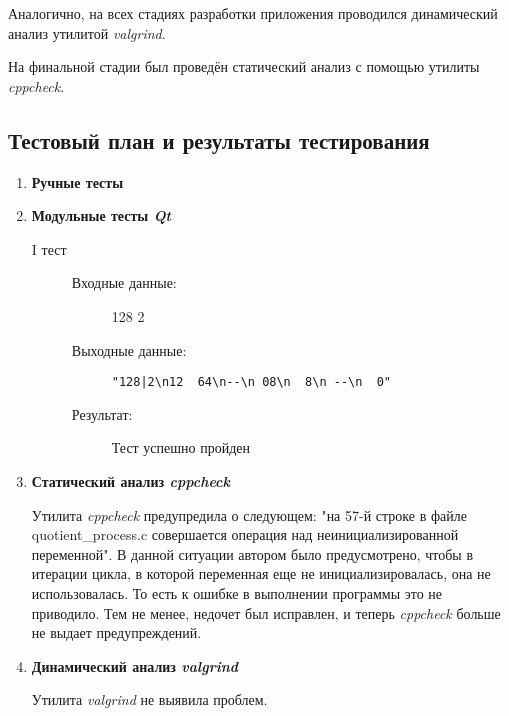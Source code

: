 \documentclass[12pt,a4paper]{report}
\begin{document}
Аналогично, на всех стадиях разработки приложения проводился динамический анализ утилитой \textit{valgrind}.

На финальной стадии был проведён статический анализ с помощью утилиты \textit{cppcheck}.
\subsection{Тестовый план и результаты тестирования}
\hspace{\parindent}
\begin{enumerate}

\item \textbf{Ручные тесты}


\item \textbf{Модульные тесты \textit{Qt}}

\begin{description}
\item[I тест]
\hspace{\parindent}
\begin{flushleft}
\begin{description}
\item[Входные данные:] 128 2
\item[Выходные данные:] \verb/"128|2\n12  64\n--\n 08\n  8\n --\n  0"/
\item[Результат:] Тест успешно пройден
\end{description}
\end{flushleft}
\end{description}

\item \textbf{Статический анализ \textit{cppcheck}}

Утилита \textit{cppcheck} предупредила о следующем: "на 57-й строке в файле quotient\_process.c совершается операция над неинициализированной переменной".
В данной ситуации автором было предусмотрено, чтобы в итерации цикла, в которой переменная еще не инициализировалась, она не использовалась. То есть к ошибке в выполнении программы это не приводило. Тем не менее, недочет был исправлен, и теперь \textit{cppcheck} больше не выдает предупреждений.

\item \textbf{Динамический анализ \textit{valgrind}}

Утилита \textit{valgrind} не выявила проблем.
\end{enumerate}
\end{document}
